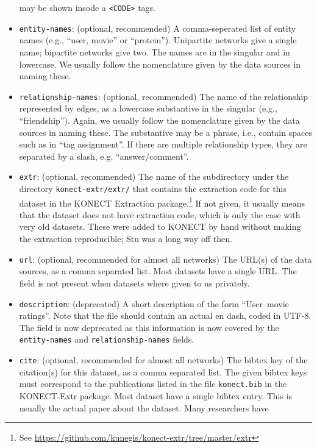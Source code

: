\documentclass{article}
\begin{document}
\begin{itemize}
  may be shown insode a \texttt{<CODE>} tags. 
\item \texttt{entity-names}: (optional, recommended) A comma-seperated list of
  entity names (e.g., ``user, movie'' or ``protein'').  Unipartite networks give
  a single name; bipartite networks give two.
  The names are in the singular and in lowercase. 
  We usually follow the nomenclature given by the data sources in naming
  these. 
\item \texttt{relationship-names}: (optional, recommended) The name of the
  relationship represented by edges, as a lowercase substantive in the singular (e.g.,
  ``friendship'').
  Again, we usually follow the nomenclature given by the data sources in naming
  these.  The substantive may be a phrase, i.e., contain spaces such as
  in ``tag assignment''.  If there are multiple relationship types, they
  are separated by a slash, e.g. ``answer/comment''.
\item \texttt{extr}: (optional, recommended) The name of the
  subdirectory under the directory \texttt{konect-extr/extr/} that
  contains the extraction code for this dataset in the KONECT
  Extraction package.\footnote{See
    \href{https://github.com/kunegis/konect-extr/tree/master/extr}{https://github.com/kunegis/konect-extr/tree/master/extr}} 
  If not given, it usually means that the dataset does not have
  extraction code, which is only the case with very old datasets.  These
  were added to KONECT by hand without making the extraction
  reproducible; Stu was a long way off then. 
\item \texttt{url}: (optional, recommended for almost all networks) The
  URL(s) of the data sources, as a comma 
  separated list.  Most datasets have a single URL.  
  The field is not present when datasets where given to us privately. 
\item \texttt{description}: (deprecated) A short description of the form
  ``User–movie ratings''.  Note that the file should contain an
  actual en dash, coded in UTF-8.
  The field is now deprecated as this information is now covered by the
  \texttt{entity-names} and \texttt{relationship-names} fields. 
\item \texttt{cite}: (optional, recommended for almost all networks) The
  bibtex key of the citation(s) for this dataset, as a  
  comma separated list.  The given bibtex keys must correspond to the
  publications listed in the file \texttt{konect.bib} in the KONECT-Extr
  package. 
  Most dataset have a single bibtex entry.  This
  is usually the actual paper about the dataset.  Many researchers have

\end{itemize}
\end{document}
